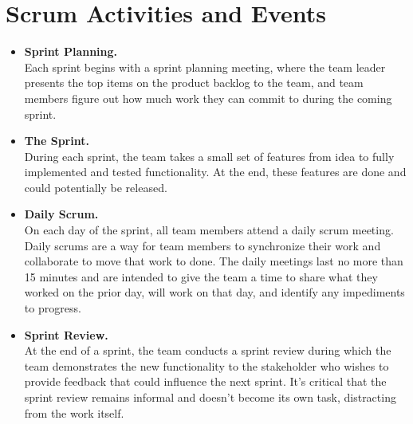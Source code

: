 \newpage 

\section{Scrum Activities and Events}
\begin{itemize}
	\item \textbf{Sprint Planning.}  \hfill \vspace{0.2cm} \\
	Each sprint begins with a sprint planning meeting, where the team leader presents the top items on the product backlog to the team, and team members figure out how much work they can commit to during the coming sprint.
	
	\item \textbf{The Sprint.} \hfill \vspace{0.2cm} \\
	During each sprint, the team takes a small set of features from idea to fully implemented and tested functionality. At the end, these features are done and could potentially be released.
	
	\item \textbf{Daily Scrum.} \hfill \vspace{0.2cm} \\
	On each day of the sprint, all team members attend a daily scrum meeting. Daily scrums are a way for team members to synchronize their work and collaborate to move that work to done. The daily meetings last no more than 15 minutes and are intended to give the team a time to share what they worked on the prior day, will work on that day, and identify any impediments to progress.
	
	\item  \textbf{Sprint Review.}  \hfill \vspace{0.2cm} \\
	At the end of a sprint, the team conducts a sprint review during which the team demonstrates the new functionality to the stakeholder who wishes to provide feedback that could influence the next sprint. It's critical that the sprint review remains informal and doesn't become its own task, distracting from the work itself.
\end{itemize}

